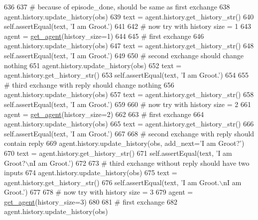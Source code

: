 \begin{DoxyCode}
636 
637         \textcolor{comment}{# because of episode\_done, should be same as first exchange}
638         agent.history.update\_history(obs)
639         text = agent.history.get\_history\_str()
640         self.assertEqual(text, \textcolor{stringliteral}{'I am Groot.'})
641 
642         \textcolor{comment}{# now try with history size = 1}
643         agent = \hyperlink{namespacetests_1_1test__torch__agent_ae929d109305aaea29fbfa13ecf1f32e9}{get\_agent}(history\_size=1)
644 
645         \textcolor{comment}{# first exchange}
646         agent.history.update\_history(obs)
647         text = agent.history.get\_history\_str()
648         self.assertEqual(text, \textcolor{stringliteral}{'I am Groot.'})
649 
650         \textcolor{comment}{# second exchange should change nothing}
651         agent.history.update\_history(obs)
652         text = agent.history.get\_history\_str()
653         self.assertEqual(text, \textcolor{stringliteral}{'I am Groot.'})
654 
655         \textcolor{comment}{# third exchange with reply should change nothing}
656         agent.history.update\_history(obs)
657         text = agent.history.get\_history\_str()
658         self.assertEqual(text, \textcolor{stringliteral}{'I am Groot.'})
659 
660         \textcolor{comment}{# now try with history size = 2}
661         agent = \hyperlink{namespacetests_1_1test__torch__agent_ae929d109305aaea29fbfa13ecf1f32e9}{get\_agent}(history\_size=2)
662 
663         \textcolor{comment}{# first exchange}
664         agent.history.update\_history(obs)
665         text = agent.history.get\_history\_str()
666         self.assertEqual(text, \textcolor{stringliteral}{'I am Groot.'})
667 
668         \textcolor{comment}{# second exchange with reply should contain reply}
669         agent.history.update\_history(obs, add\_next=\textcolor{stringliteral}{'I am Groot?'})
670         text = agent.history.get\_history\_str()
671         self.assertEqual(text, \textcolor{stringliteral}{'I am Groot?\(\backslash\)nI am Groot.'})
672 
673         \textcolor{comment}{# third exchange without reply should have two inputs}
674         agent.history.update\_history(obs)
675         text = agent.history.get\_history\_str()
676         self.assertEqual(text, \textcolor{stringliteral}{'I am Groot.\(\backslash\)nI am Groot.'})
677 
678         \textcolor{comment}{# now try with history size = 3}
679         agent = \hyperlink{namespacetests_1_1test__torch__agent_ae929d109305aaea29fbfa13ecf1f32e9}{get\_agent}(history\_size=3)
680 
681         \textcolor{comment}{# first exchange}
682         agent.history.update\_history(obs)

\end{DoxyCode}

